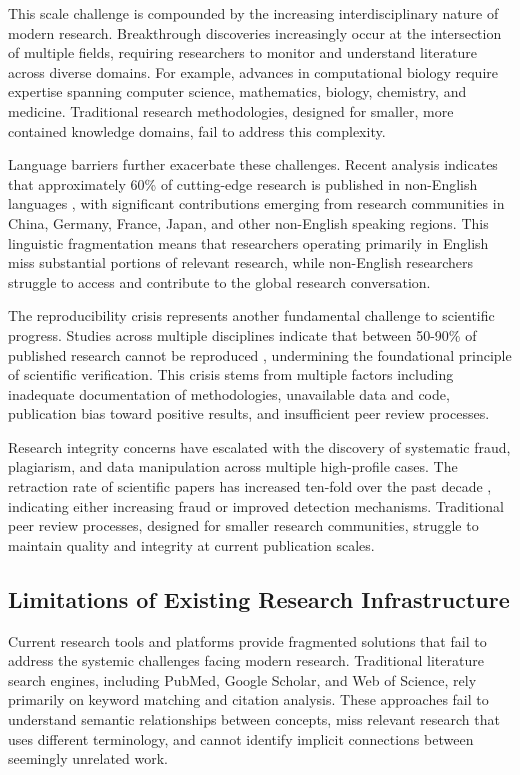 \documentclass[10pt,twocolumn]{article}
\begin{document}
This scale challenge is compounded by the increasing interdisciplinary nature of modern research. Breakthrough discoveries increasingly occur at the intersection of multiple fields, requiring researchers to monitor and understand literature across diverse domains. For example, advances in computational biology require expertise spanning computer science, mathematics, biology, chemistry, and medicine. Traditional research methodologies, designed for smaller, more contained knowledge domains, fail to address this complexity.

Language barriers further exacerbate these challenges. Recent analysis indicates that approximately 60\% of cutting-edge research is published in non-English languages \cite{amano2016languages}, with significant contributions emerging from research communities in China, Germany, France, Japan, and other non-English speaking regions. This linguistic fragmentation means that researchers operating primarily in English miss substantial portions of relevant research, while non-English researchers struggle to access and contribute to the global research conversation.

The reproducibility crisis represents another fundamental challenge to scientific progress. Studies across multiple disciplines indicate that between 50-90\% of published research cannot be reproduced \cite{baker2016reproducibility}, undermining the foundational principle of scientific verification. This crisis stems from multiple factors including inadequate documentation of methodologies, unavailable data and code, publication bias toward positive results, and insufficient peer review processes.

Research integrity concerns have escalated with the discovery of systematic fraud, plagiarism, and data manipulation across multiple high-profile cases. The retraction rate of scientific papers has increased ten-fold over the past decade \cite{fanelli2009many}, indicating either increasing fraud or improved detection mechanisms. Traditional peer review processes, designed for smaller research communities, struggle to maintain quality and integrity at current publication scales.

\subsection{Limitations of Existing Research Infrastructure}

Current research tools and platforms provide fragmented solutions that fail to address the systemic challenges facing modern research. Traditional literature search engines, including PubMed, Google Scholar, and Web of Science, rely primarily on keyword matching and citation analysis. These approaches fail to understand semantic relationships between concepts, miss relevant research that uses different terminology, and cannot identify implicit connections between seemingly unrelated work.
\end{document}
